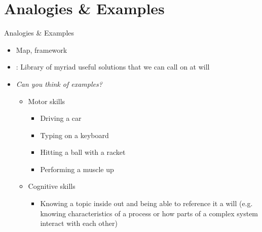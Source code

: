 \documentclass{ercisbeamer}
\begin{document}
\section{Analogies \& Examples}
\begin{frame}{Analogies \& Examples}
    \begin{tbox}
        \begin{itemize}
            \item Map, framework
            \item {}: Library of myriad useful solutions that we can call on at will
        \end{itemize}
    \end{tbox}

    \vspace{.5em}

    \begin{tbox}
        \begin{itemize}
            \item \emph{Can you think of examples?} \pause
            \begin{itemize}
                \item Motor skills
                \begin{itemize}
                    \item Driving a car
                    \item Typing on a keyboard
                    \item Hitting a ball with a racket
                    \item Performing a muscle up
                \end{itemize}
                \item Cognitive skills
                \begin{itemize}
                    \item Knowing a topic inside out and being able to reference it a will (e.g. knowing characteristics of a process or how parts of a complex system interact with each other)
                \end{itemize}
            \end{itemize}
        \end{itemize}    
    \end{tbox}
\end{frame}

\end{document}
